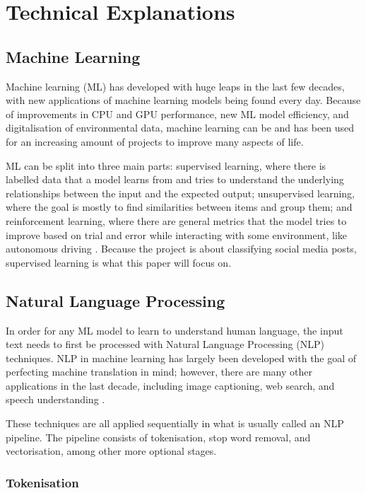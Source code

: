 \documentclass{l4proj}
\begin{document}
\section{Technical Explanations}

\subsection{Machine Learning}

Machine learning (ML) has developed with huge leaps in the last few decades, with new applications of machine learning models being found every day. Because of improvements in CPU and GPU performance, new ML model efficiency, and digitalisation of environmental data, machine learning can be and has been used for an increasing amount of projects to improve many aspects of life.

ML can be split into three main parts: supervised learning, where there is labelled data that a model learns from and tries to understand the underlying relationships between the input and the expected output; unsupervised learning, where the goal is mostly to find similarities between items and group them; and reinforcement learning, where there are general metrics that the model tries to improve based on trial and error while interacting with some environment, like autonomous driving \citep{MLTypes}. Because the project is about classifying social media posts, supervised learning is what this paper will focus on.


\subsection{Natural Language Processing}
\label{subsec:NLP}

In order for any ML model to learn to understand human language, the input text needs to first be processed with Natural Language Processing (NLP) techniques. NLP in machine learning has largely been developed with the goal of perfecting machine translation in mind; however, there are many other applications in the last decade, including image captioning, web search, and speech understanding \citep{NLPIntro}.

These techniques are all applied sequentially in what is usually called an NLP pipeline. The pipeline consists of tokenisation, stop word removal, and vectorisation, among other more optional stages.

\subsubsection{Tokenisation}
\end{document}
